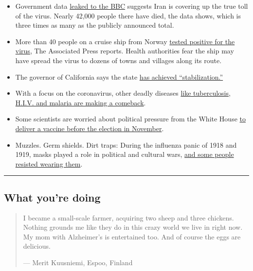 \begin{itemize}
\item
  Government data
  \href{https://www.bbc.com/news/world-middle-east-53598965}{leaked to
  the BBC} suggests Iran is covering up the true toll of the virus.
  Nearly 42,000 people there have died, the data shows, which is three
  times as many as the publicly announced total.
\item
  More than 40 people on a cruise ship from Norway
  \href{https://news.yahoo.com/outbreak-hits-norway-cruise-ship-101611509.html}{tested
  positive for the virus}, The Associated Press reports. Health
  authorities fear the ship may have spread the virus to dozens of towns
  and villages along its route.
\item
  The governor of California says the state
  \href{https://www.nytimes3xbfgragh.onion/2020/08/03/world/coronavirus-covid-19.html?action=click\&module=Top\%20Stories\&pgtype=Homepage\#link-450dc05c}{has
  achieved ``stabilization.''}
\item
  With a focus on the coronavirus, other deadly diseases
  \href{https://www.nytimes3xbfgragh.onion/2020/08/03/health/coronavirus-tuberculosis-aids-malaria.html}{like
  tuberculosis, H.I.V. and malaria are making a comeback}.
\item
  Some scientists are worried about political pressure from the White
  House
  \href{https://www.nytimes3xbfgragh.onion/2020/08/02/us/politics/coronavirus-vaccine.html}{to
  deliver a vaccine before the election in November}.
\item
  Muzzles. Germ shields. Dirt traps: During the influenza panic of 1918
  and 1919, masks played a role in political and cultural wars,
  \href{https://www.nytimes3xbfgragh.onion/2020/08/03/us/mask-protests-1918.html}{and
  some people resisted wearing them}.
\end{itemize}

\begin{center}\rule{0.5\linewidth}{\linethickness}\end{center}

\hypertarget{what-youre-doing}{%
\subsection{What you're doing}\label{what-youre-doing}}

\begin{quote}
I became a small-scale farmer, acquiring two sheep and three chickens.
Nothing grounds me like they do in this crazy world we live in right
now. My mom with Alzheimer's is entertained too. And of course the eggs
are delicious.

--- Merit Kuusniemi, Espoo, Finland
\end{quote}

